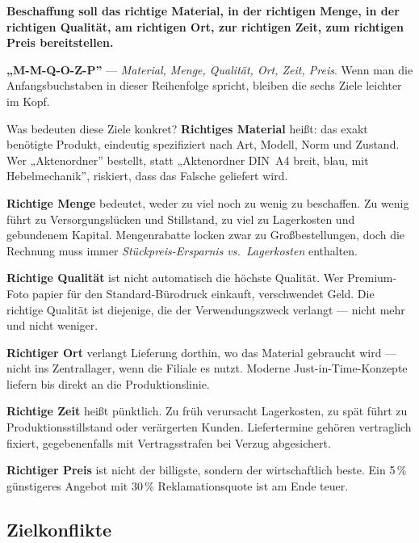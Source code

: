 \documentclass[11pt, a4paper]{article}
\begin{document}
\begin{merksatz}[title={Die sechs Beschaffungsziele}]
\textbf{Beschaffung soll das richtige Material, in der richtigen Menge, in der richtigen
Qualität, am richtigen Ort, zur richtigen Zeit, zum richtigen Preis bereitstellen.}
\end{merksatz}

\begin{eselsbruecke}
\textbf{„M-M-Q-O-Z-P”} --- \emph{Material, Menge, Qualität, Ort, Zeit, Preis}.
Wenn man die Anfangsbuchstaben in dieser Reihenfolge spricht, bleiben die sechs Ziele
leichter im Kopf.
\end{eselsbruecke}

Was bedeuten diese Ziele konkret? \textbf{Richtiges Material} heißt: das exakt benötigte
Produkt, eindeutig spezifiziert nach Art, Modell, Norm und Zustand. Wer „Aktenordner”
bestellt, statt „Aktenordner DIN~A4 breit, blau, mit Hebelmechanik”, riskiert, dass
das Falsche geliefert wird.

\textbf{Richtige Menge} bedeutet, weder zu viel noch zu wenig zu beschaffen. Zu wenig
führt zu Versorgungslücken und Stillstand, zu viel zu Lagerkosten und gebundenem
Kapital. Mengenrabatte locken zwar zu Großbestellungen, doch die Rechnung muss immer
\emph{Stückpreis-Ersparnis vs.\ Lagerkosten} enthalten.

\textbf{Richtige Qualität} ist nicht automatisch die höchste Qualität. Wer Premium-Foto­
papier für den Standard-Bürodruck einkauft, verschwendet Geld. Die richtige Qualität
ist diejenige, die der Verwendungszweck verlangt --- nicht mehr und nicht weniger.

\textbf{Richtiger Ort} verlangt Lieferung dorthin, wo das Material gebraucht wird ---
nicht ins Zentrallager, wenn die Filiale es nutzt. Moderne Just-in-Time-Konzepte
liefern bis direkt an die Produktionslinie.

\textbf{Richtige Zeit} heißt pünktlich. Zu früh verursacht Lagerkosten, zu spät führt
zu Produktionsstillstand oder verärgerten Kunden. Liefertermine gehören vertraglich
fixiert, gegebenenfalls mit Vertragsstrafen bei Verzug abgesichert.

\textbf{Richtiger Preis} ist nicht der billigste, sondern der wirtschaftlich beste.
Ein 5\,\% günstigeres Angebot mit 30\,\% Reklamationsquote ist am Ende teuer.

\subsection{Zielkonflikte}
\end{document}
